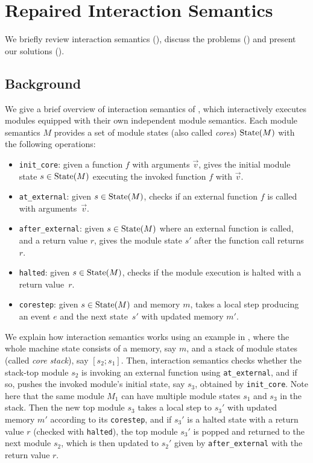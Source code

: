 \section{Repaired Interaction Semantics}
\label{sec:overview-semantics}

We briefly review interaction semantics (), discuss the problems () and present our solutions ().

\subsection{Background}
\label{sec:overview-semantics:background}

We give a brief overview of interaction semantics of \ccc{}, which
interactively executes modules equipped with their own independent
module semantics. Each module semantics $M$ provides
a set of module states (also called \emph{cores}) $\textrm{State}(M)$ with the following operations:
\begin{itemize}
\item \texttt{init\_core}: given a function $f$ with arguments $\vec{v}$,
  gives the initial module state $s \in \textrm{State}(M)$
  executing the invoked function $f$ with $\vec{v}$.
\item \texttt{at\_external}: given $s \in \textrm{State}(M)$,
  checks if an external function $f$ is called with arguments~$\vec{v}$.
\item \texttt{after\_external}: given $s \in \textrm{State}(M)$
  where an external function is called,
  and a return value $r$,
  gives the module state $s'$
  after the function call returns $r$.
\item \texttt{halted}: given $s \in \textrm{State}(M)$, checks if the module execution is halted with a return value~$r$.
\item \texttt{corestep}: given $s \in \textrm{State}(M)$ and memory $m$, takes a local step producing an event $e$ and the next state~$s'$ with updated memory $m'$.
\end{itemize}

We explain how interaction semantics works using an example in
, where the whole machine state consists of a
memory, say $m$, and a stack of module states (called \emph{core stack}), say $[s_2; s_1]$.
Then, interaction semantics checks whether the stack-top module $s_2$
is invoking an external function using \texttt{at\_external}, and if
so, pushes the invoked module's initial state, say $s_3$, obtained by
\texttt{init\_core}. Note here that the same module $M_1$ can have
multiple module states $s_1$ and $s_3$ in the stack.  Then the
new top module $s_3$ takes a local step to $s_3'$ with updated memory
$m'$ according to its \texttt{corestep}, and if $s_3'$ is a halted
state with a return value $r$ (checked with \texttt{halted}), the top
module $s_3'$ is popped and returned to the next module $s_2$, which
is then updated to $s_2'$ given by \texttt{after\_external} with the return
value $r$.

